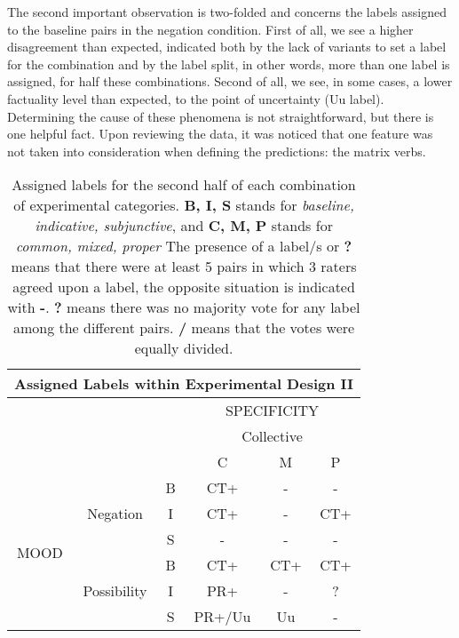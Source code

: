 The second important observation is two-folded and concerns the labels assigned to the baseline pairs in the negation condition. First of all, we see a higher disagreement than expected, indicated both by the lack of variants to set a label for the combination and by the label split, in other words, more than one label is assigned, for half these combinations. Second of all, we see, in some cases, a lower factuality level than expected, to the point of uncertainty (Uu label). Determining the cause of these phenomena is not straightforward, but there is one helpful fact. Upon reviewing the data, it was noticed that one feature was not taken into consideration when defining the predictions: the matrix verbs.\\

\begin{table}[h!]
\centering
\begin{tabular}{|c|c|c|c|c|c|}
\hline
\multicolumn{6}{|c|}{Assigned Labels within Experimental Design II}\\\hline
                      & & &\multicolumn{3}{c|}{SPECIFICITY} \\\cline{4-6} 
                      & & &\multicolumn{3}{c|}{Collective}\\\cline{4-6} 
                      & & & C & M & P \\\hline 
\multirow{6}{*}{MOOD} & \multirow{3}{*}{Negation} & B & CT+ & - & - \\\cline{3-6}
                      &                           & I & CT+ & - & CT+ \\\cline{3-6}
                      &                           & S & - & - & - \\ \cline{2-6}                     
                      &\multirow{3}{*}{Possibility}& B & CT+ & CT+ & CT+\\\cline{3-6}
                      &                           & I & PR+ & - & ?\\\cline{3-6}
                      &                           & S & PR+/Uu & Uu & - \\\hline                                                          
\end{tabular}
\caption[Assigned labels II.]{Assigned labels for the second half of each combination of experimental categories. \textbf{B, I, S} stands for \textit{baseline, indicative, subjunctive}, and \textbf{C, M, P} stands for \textit{common, mixed, proper} The presence of a label/s or \textbf{?} means that there were at least 5 pairs in which 3 raters agreed upon a label, the opposite situation is indicated with \textbf{-}. \textbf{?} means there was no majority vote for any label among the different pairs. \textbf{/} means that the votes were equally divided.}
\label{tab:ass2}
\end{table}

